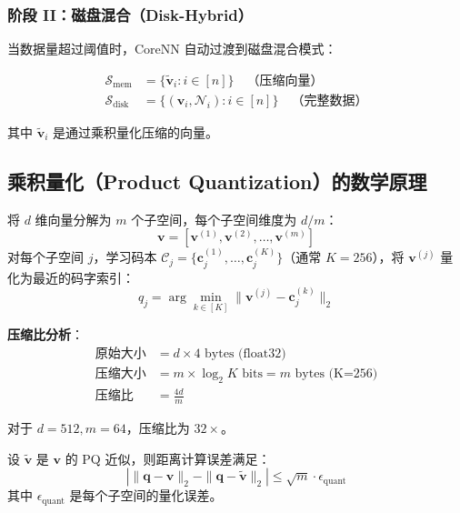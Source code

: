 \subsubsection{阶段 II：磁盘混合（Disk-Hybrid）}

当数据量超过阈值时，CoreNN 自动过渡到磁盘混合模式：

\begin{equation}
\begin{aligned}
\mathcal{S}_{\text{mem}} &= \{\tilde{\mathbf{v}}_i : i \in [n]\} \quad \text{（压缩向量）} \\
\mathcal{S}_{\text{disk}} &= \{(\mathbf{v}_i, \mathcal{N}_i) : i \in [n]\} \quad \text{（完整数据）}
\end{aligned}
\end{equation}

其中 $\tilde{\mathbf{v}}_i$ 是通过乘积量化压缩的向量。

\subsection{乘积量化（Product Quantization）的数学原理}

\begin{definition}[乘积量化]
将 $d$ 维向量分解为 $m$ 个子空间，每个子空间维度为 $d/m$：
\begin{equation}
\mathbf{v} = [\mathbf{v}^{(1)}, \mathbf{v}^{(2)}, \ldots, \mathbf{v}^{(m)}]
\end{equation}
对每个子空间 $j$，学习码本 $\mathcal{C}_j = \{\mathbf{c}_j^{(1)}, \ldots, \mathbf{c}_j^{(K)}\}$（通常 $K=256$），将 $\mathbf{v}^{(j)}$ 量化为最近的码字索引：
\begin{equation}
q_j = \arg\min_{k \in [K]} \|\mathbf{v}^{(j)} - \mathbf{c}_j^{(k)}\|_2
\end{equation}
\end{definition}

\textbf{压缩比分析}：
\begin{align}
\text{原始大小} &= d \times 4 \text{ bytes (float32)} \\
\text{压缩大小} &= m \times \log_2 K \text{ bits} = m \text{ bytes (K=256)} \\
\text{压缩比} &= \frac{4d}{m}
\end{align}

对于 $d=512, m=64$，压缩比为 $32\times$。

\begin{theorem}[PQ 距离近似误差]
设 $\tilde{\mathbf{v}}$ 是 $\mathbf{v}$ 的 PQ 近似，则距离计算误差满足：
\begin{equation}
|\|\mathbf{q} - \mathbf{v}\|_2 - \|\mathbf{q} - \tilde{\mathbf{v}}\|_2| \leq \sqrt{m} \cdot \epsilon_{\text{quant}}
\end{equation}
其中 $\epsilon_{\text{quant}}$ 是每个子空间的量化误差。
\end{theorem}

